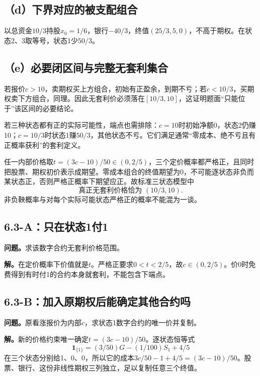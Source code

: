 \documentclass[11pt,a4paper,UTF8,fontset=fandol]{ctexart}
\begin{document}
\subsection{（d）下界对应的被支配组合}\label{dux4e0bux754cux5bf9ux5e94ux7684ux88abux652fux914dux7ec4ux5408}

以总资金\(10/3\)持股\(\boxed{x_0=1/6}\)，银行\(-40/3\)，终值\((25/3,5,0)\)，不高于期权。在状态2、3取等号，状态1少\(50/3\)。

\subsection{（e）必要闭区间与完整无套利集合}\label{eux5fc5ux8981ux95edux533aux95f4ux4e0eux5b8cux6574ux65e0ux5957ux5229ux96c6ux5408}

若报价\(c>10\)，卖期权买上方组合，初始有正盈余，到期不亏；若\(c<10/3\)，买期权卖下方组合，同理。因此无套利价必须落在\([10/3,10]\)，这证明题面``只能位于''该区间的必要结论。

若三种状态都有正的实际可能性，端点也需排除：\(c=10\)时初始净额0，状态2仍赚10；\(c=10/3\)时状态1赚\(50/3\)，其他状态不亏。它们满足通常``零成本、绝不亏且有正概率获利''的套利定义。

任一内部价格取\(t=(3c-10)/50\in(0,2/5)\)，三个定价概率都严格正，且同时把股票、期权初价表示成期望。零成本组合的终值期望为0，不可能逐状态非负而某状态正，否则严格正概率下期望应正。故标准三状态模型中
\[\boxed{\text{真正无套利价格恰为 }(10/3,10).}\]
非负鞅概率与对每个实际可能状态严格正的概率不能混为一谈。

\subsection{6.3-A：只在状态1付1}\label{aux53eaux5728ux72b6ux60011ux4ed81}

\textbf{问题。}求该数字合约无套利价格范围。

\textbf{解。}在定价概率下价值就是\(t\)。严格正要求\(0<t<2/5\)，故\(\boxed{c\in(0,2/5)}\)。价0时免费得到有时付1的合约本身就套利，不能包含下端点。

\subsection{6.3-B：加入原期权后能确定其他合约吗}\label{bux52a0ux5165ux539fux671fux6743ux540eux80fdux786eux5b9aux5176ux4ed6ux5408ux7ea6ux5417}

\textbf{问题。}原看涨报价为内部\(c\)，求状态1数字合约的唯一价并复制。

\textbf{解。}新的价格约束唯一确定\(t=(3c-10)/50\)。逐状态恒等式
\[\mathbf1_{\{1\}}=(3/50)G-(1/100)S_1+4/5\]
在三个状态分别给1、0、0，所以它的成本\(3c/50-1+4/5=\boxed{(3c-10)/50}\)。股票、银行、这份非线性期权三列独立，足以复制任意三个终值。
\end{document}
